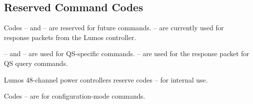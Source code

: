 \documentclass[letterpaper,twoside,onecolumn,openright,final]{memoir}
\begin{document}
\subsection{Reserved Command Codes}
Codes -- and -- are reserved for future commands.  -- are currently used
for response packets from the Lumos controller.
\begin{QS*}
	-- and -- are used for QS-specific commands.
	-- are used for the response packet for QS query commands.
\end{QS*}

Lumos 48-channel power controllers reserve codes -- for internal use.

Codes -- are for configuration-mode commands.
\newpage
\end{document}
